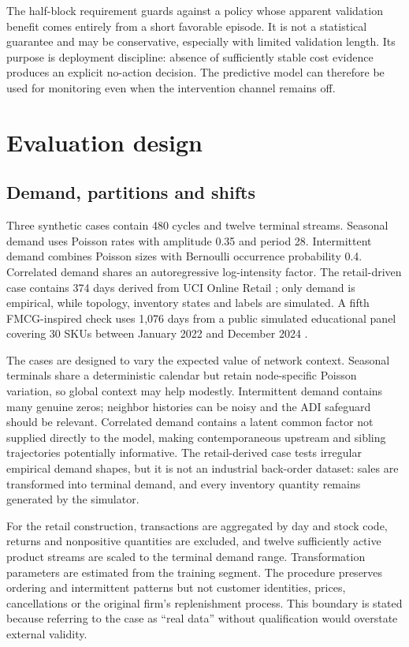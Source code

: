 \documentclass[11pt,a4paper]{article}
\begin{document}
The half-block requirement guards against a policy whose apparent validation benefit comes entirely from a short favorable episode. It is not a statistical guarantee and may be conservative, especially with limited validation length. Its purpose is deployment discipline: absence of sufficiently stable cost evidence produces an explicit no-action decision. The predictive model can therefore be used for monitoring even when the intervention channel remains off.

\section{Evaluation design}
\subsection{Demand, partitions and shifts}
Three synthetic cases contain 480 cycles and twelve terminal streams. Seasonal demand uses Poisson rates with amplitude 0.35 and period 28. Intermittent demand combines Poisson sizes with Bernoulli occurrence probability 0.4. Correlated demand shares an autoregressive log-intensity factor. The retail-driven case contains 374 days derived from UCI Online Retail \cite{uci}; only demand is empirical, while topology, inventory states and labels are simulated. A fifth FMCG-inspired check uses 1,076 days from a public simulated educational panel covering 30 SKUs between January 2022 and December 2024 \cite{fmcg}.

The cases are designed to vary the expected value of network context. Seasonal terminals share a deterministic calendar but retain node-specific Poisson variation, so global context may help modestly. Intermittent demand contains many genuine zeros; neighbor histories can be noisy and the ADI safeguard should be relevant. Correlated demand contains a latent common factor not supplied directly to the model, making contemporaneous upstream and sibling trajectories potentially informative. The retail-derived case tests irregular empirical demand shapes, but it is not an industrial back-order dataset: sales are transformed into terminal demand, and every inventory quantity remains generated by the simulator.

For the retail construction, transactions are aggregated by day and stock code, returns and nonpositive quantities are excluded, and twelve sufficiently active product streams are scaled to the terminal demand range. Transformation parameters are estimated from the training segment. The procedure preserves ordering and intermittent patterns but not customer identities, prices, cancellations or the original firm's replenishment process. This boundary is stated because referring to the case as ``real data'' without qualification would overstate external validity.
\end{document}
